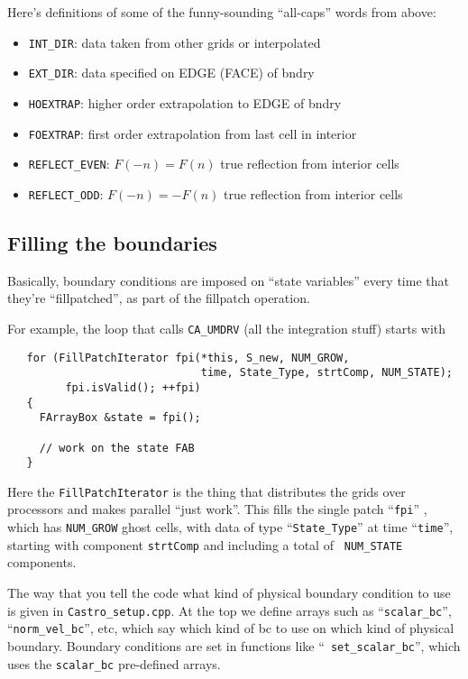 Here's definitions of some of the funny-sounding ``all-caps''
words from above:
\begin{itemize}
\item {\tt INT\_DIR}: data taken from other grids or interpolated

\item {\tt EXT\_DIR}: data specified on EDGE (FACE) of bndry

\item {\tt HOEXTRAP}: higher order extrapolation to EDGE of bndry

\item {\tt FOEXTRAP}: first order extrapolation from last cell in interior

\item {\tt REFLECT\_EVEN}: $F(-n) = F(n)$ true reflection from interior cells

\item {\tt REFLECT\_ODD}: $F(-n) = -F(n)$ true reflection from interior cells
\end{itemize}


\subsection{Filling the boundaries}

Basically, boundary conditions are imposed on ``state variables'' every
time that they're ``fillpatched'', as part of the fillpatch operation.

For example, the loop that calls {\tt CA\_UMDRV} (all the integration stuff) starts with
\begin{lstlisting}
   for (FillPatchIterator fpi(*this, S_new, NUM_GROW,
                              time, State_Type, strtComp, NUM_STATE);
         fpi.isValid(); ++fpi)
   {
     FArrayBox &state = fpi();

     // work on the state FAB
   }           
\end{lstlisting}
Here the {\tt FillPatchIterator} is the thing that distributes the
grids over processors and makes parallel ``just work''. This fills the
single patch ``{\tt fpi}'' , which has {\tt NUM\_GROW} ghost cells,
with data of type ``{\tt State\_Type}'' at time ``{\tt time}'',
starting with component {\tt strtComp} and including a total of {\tt
  NUM\_STATE} components.

The way that you tell the code what kind of physical boundary
condition to use is given in {\tt Castro\_setup.cpp}. At the top we
define arrays such as ``{\tt scalar\_bc}'', ``{\tt norm\_vel\_bc}'',
etc, which say which kind of bc to use on which kind of physical
boundary.  Boundary conditions are set in functions like ``{\tt
  set\_scalar\_bc}'', which uses the {\tt scalar\_bc} pre-defined
arrays.

